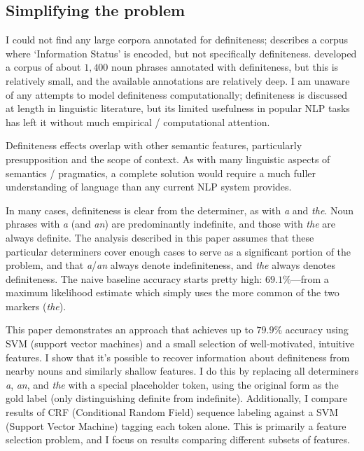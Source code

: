 \documentclass[11pt]{article}\usepackage{graphicx, color}
\begin{document}
\subsection{Simplifying the problem}
I could not find any large corpora annotated for definiteness; \citet{calhoun:2010} describes a corpus where `Information Status' is encoded, but not specifically definiteness. \citet{vieira:2000} developed a corpus of about $1,400$ noun phrases annotated with definiteness, but this is relatively small, and the available annotations are relatively deep. I am unaware of any attempts to model definiteness computationally; definiteness is discussed at length in linguistic literature, but its limited usefulness in popular NLP tasks has left it without much empirical / computational attention.

Definiteness effects overlap with other semantic features, particularly presupposition and the scope of context. As with many linguistic aspects of semantics / pragmatics, a complete solution would require a much fuller understanding of language than any current NLP system provides.

In many cases, definiteness is clear from the determiner, as with \emph{a} and \emph{the}. Noun phrases with \emph{a} (and \emph{an}) are predominantly indefinite, and those with \emph{the} are always definite. The analysis described in this paper assumes that these particular determiners cover enough cases to serve as a significant portion of the problem, and that \emph{a}/\emph{an} always denote indefiniteness, and \emph{the} always denotes definiteness. The naive baseline accuracy starts pretty high: $69.1\%$---from a maximum likelihood estimate which simply uses the more common of the two markers (\emph{the}).

This paper demonstrates an approach that achieves up to $79.9\%$ accuracy using SVM (support vector machines) and a small selection of well-motivated, intuitive features.
I show that it's possible to recover information about definiteness from nearby nouns and similarly shallow features. I do this by replacing all determiners \emph{a}, \emph{an}, and \emph{the} with a special placeholder token, using the original form as the gold label (only distinguishing definite from indefinite). Additionally, I compare results of CRF (Conditional Random Field) sequence labeling against a SVM (Support Vector Machine) tagging each token alone.
This is primarily a feature selection problem, and I focus on results comparing different subsets of features.
\end{document}
